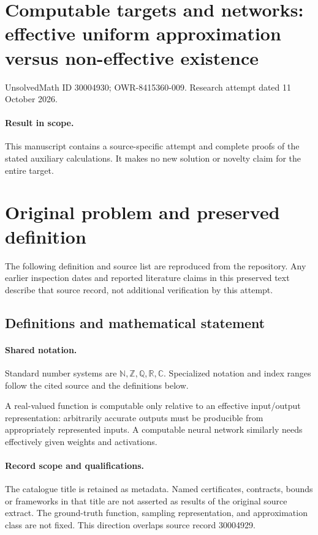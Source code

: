 \documentclass[11pt]{article}
\begin{document}
\section*{Computable targets and networks: effective uniform approximation versus non-effective existence}
\noindent UnsolvedMath ID 30004930; OWR-8415360-009. Research attempt dated 11 October 2026.
\paragraph{Result in scope.}This manuscript contains a source-specific attempt and complete proofs of the stated auxiliary calculations. It makes no new solution or novelty claim for the entire target.
\section{Original problem and preserved definition}
The following definition and source list are reproduced from the repository. Any earlier inspection dates and reported literature claims in this preserved text describe that source record, not additional verification by this attempt.
\subsection{Definitions and mathematical statement}

\paragraph{Shared notation.}Standard number systems are $\mathbb N,\mathbb Z,\mathbb Q,\mathbb R,\mathbb C$. Specialized notation and index ranges follow the cited source and the definitions below.


A real-valued function is computable only relative to an effective input/output representation: arbitrarily accurate outputs must be producible from appropriately represented inputs. A computable neural network similarly needs effectively given weights and activations.
\paragraph{Record scope and qualifications.}
The catalogue title is retained as metadata. Named certificates, contracts, bounds or frameworks in that title are not asserted as results of the original source extract.
The ground-truth function, sampling representation, and approximation class are not fixed. This direction overlaps source record 30004929.
\end{document}
